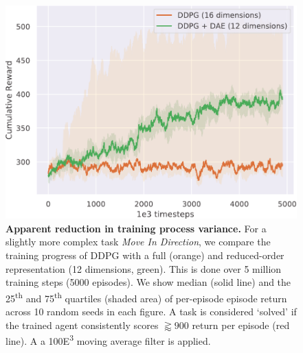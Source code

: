 \documentclass[letterpaper, 10 pt, conference]{ieeeconf}
\begin{document}
\begin{figure}[t]
    \centering
    \includegraphics[width=\linewidth]{denoising_autoencoder25_75}
    \caption{
        \textbf{Apparent reduction in training process variance.}
        For a slightly more complex task \textit{Move In Direction}, we compare the training progress of DDPG with a full (orange) and reduced-order representation (12 dimensions, green).  This is done over 5 million training steps (5000 episodes).  We show median (solid line) and the 25\textsuperscript{th} and 75\textsuperscript{th} quartiles (shaded area) of per-episode episode return across 10 random seeds in each figure.
        A task is considered `solved' if the trained agent consistently scores $\gtrapprox 900$ return per episode (red line).  A a 100{\tiny E}\textsuperscript{3} moving average filter is applied.
    }
    \label{fig:ae-lowvar}
\end{figure}


\end{document}
